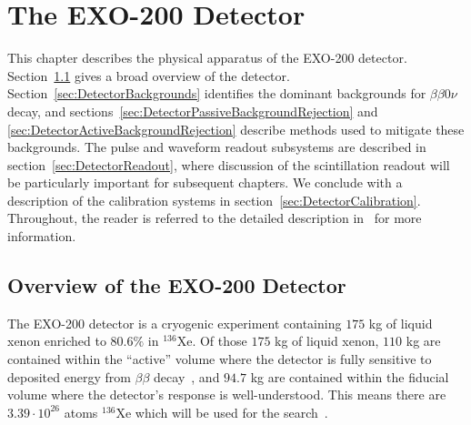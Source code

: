 \renewcommand{\thechapter}{3}
\chapter{The EXO-200 Detector}
\label{ch:EXO200Detector}

This chapter describes the physical apparatus of the EXO-200 detector.  Section~\ref{sec:DetectorOverview} gives a broad overview of the detector.  Section~\ref{sec:DetectorBackgrounds} identifies the dominant backgrounds for $\beta\beta 0\nu$ decay, and sections~\ref{sec:DetectorPassiveBackgroundRejection} and \ref{sec:DetectorActiveBackgroundRejection} describe methods used to mitigate these backgrounds.  The pulse and waveform readout subsystems are described in section~\ref{sec:DetectorReadout}, where discussion of the scintillation readout will be particularly important for subsequent chapters.  We conclude with a description of the calibration systems in section~\ref{sec:DetectorCalibration}.  Throughout, the reader is referred to the detailed description in~\cite{detectorPartI} for more information.

\section{Overview of the EXO-200 Detector}\label{sec:DetectorOverview}

The EXO-200 detector is a cryogenic experiment containing $175$ kg of liquid xenon enriched to $80.6\%$ in $^{136}$Xe.  Of those $175$ kg of liquid xenon, $110$ kg are contained within the ``active'' volume where the detector is fully sensitive to deposited energy from $\beta\beta$ decay~\cite{detectorPartI}, and $94.7$ kg are contained within the fiducial volume where the detector's response is well-understood.  This means there are $3.39 \cdot 10^{26}$ atoms $^{136}$Xe which will be used for the search~\cite{NewEXObb0nPaper_2014}.

